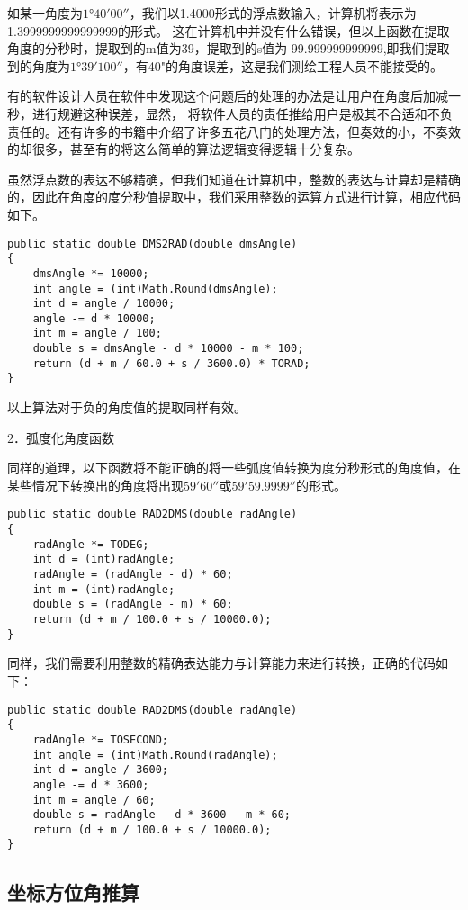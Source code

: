  如某一角度为$1°40'00''$，我们以1.4000形式的浮点数输入，计算机将表示为1.3999999999999999的形式。
 这在计算机中并没有什么错误，但以上函数在提取角度的分秒时，提取到的m值为39，提取到的s值为
 99.999999999999,即我们提取到的角度为$1°39'100''$，有40"的角度误差，这是我们测绘工程人员不能接受的。
 
 有的软件设计人员在软件中发现这个问题后的处理的办法是让用户在角度后加减一秒，进行规避这种误差，显然，
 将软件人员的责任推给用户是极其不合适和不负责任的。还有许多的书籍中介绍了许多五花八门的处理方法，但奏效的小，不奏效的却很多，甚至有的将这么简单的算法逻辑变得逻辑十分复杂。
 
 虽然浮点数的表达不够精确，但我们知道在计算机中，整数的表达与计算却是精确的，因此在角度的度分秒值提取中，我们采用整数的运算方式进行计算，相应代码如下。
 
\begin{verbatim}
public static double DMS2RAD(double dmsAngle)
{
    dmsAngle *= 10000; 
    int angle = (int)Math.Round(dmsAngle);
    int d = angle / 10000;
    angle -= d * 10000;
    int m = angle / 100;
    double s = dmsAngle - d * 10000 - m * 100;
    return (d + m / 60.0 + s / 3600.0) * TORAD;
}
\end{verbatim}

 以上算法对于负的角度值的提取同样有效。


2．弧度化角度函数

同样的道理，以下函数将不能正确的将一些弧度值转换为度分秒形式的角度值，在某些情况下转换出的角度将出现$59'60''$或$59'59.9999''$的形式。

\begin{verbatim}
public static double RAD2DMS(double radAngle)
{
    radAngle *= TODEG;
    int d = (int)radAngle;
    radAngle = (radAngle - d) * 60;
    int m = (int)radAngle;
    double s = (radAngle - m) * 60;
    return (d + m / 100.0 + s / 10000.0);
}
\end{verbatim}

同样，我们需要利用整数的精确表达能力与计算能力来进行转换，正确的代码如下：

\begin{verbatim}
public static double RAD2DMS(double radAngle)
{
    radAngle *= TOSECOND;
    int angle = (int)Math.Round(radAngle); 
    int d = angle / 3600;
    angle -= d * 3600;
    int m = angle / 60;
    double s = radAngle - d * 3600 - m * 60;
    return (d + m / 100.0 + s / 10000.0);
}
\end{verbatim}

\subsection{坐标方位角推算}

